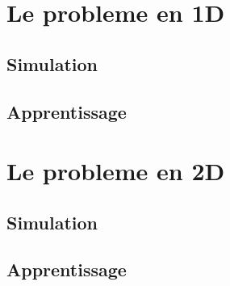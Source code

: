 \documentclass[xcolor=dvipsnames]{beamer} %
\begin{document}
\section{Le probleme en 1D}

\subsection{Simulation}

\subsection{Apprentissage}

\section{Le probleme en 2D}

\subsection{Simulation}

\subsection{Apprentissage}





% 
% 
% 
% 
% 


\end{document}
